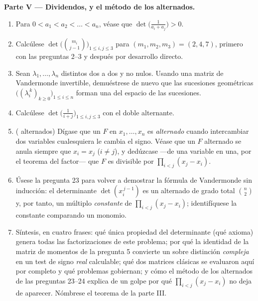 \begin{problem}
\medskip
\noindent\textbf{Parte V --- Dividendos, y el método de los
alternados.}
\begin{enumerate}[resume]
  \item Para $0 < a_1 < a_2 < \dots < a_n$, véase que
        $\det\bigl(\frac{1}{a_i + a_j}\bigr) > 0$.
  \item Calcúlese $\det\bigl(\binom{m_i}{j-1}\bigr)_{1 \leq i, j
        \leq 3}$ para $(m_1, m_2, m_3) = (2, 4, 7)$, primero con las
        preguntas 2--3 y después por desarrollo directo.
  \item Sean $\lambda_1, \dots, \lambda_n$ distintos dos a dos y no
        nulos. Usando una matriz de Vandermonde invertible,
        demuéstrese de nuevo que las sucesiones geométricas
        $\bigl((\lambda_i^{\,k})_{k \geq 0}\bigr)_{1 \leq i \leq n}$
        forman una  del espacio de las sucesiones.
  \item Calcúlese $\det\bigl(\frac{1}{i + j}\bigr)_{1 \leq i, j
        \leq 3}$ con el doble alternante.
  \item ( alternados) Dígase que un  $F$ en
        $x_1, \dots, x_n$ es \emph{alternado} cuando intercambiar
        dos variables cualesquiera le cambia el signo. Véase que un
        $F$ alternado se anula siempre que $x_i = x_j$ ($i \neq j$),
        y dedúzcase ---de una variable en una, por el teorema del
        factor--- que $F$ es divisible por $\prod_{i<j}(x_j - x_i)$.
  \item Úsese la pregunta 23 para volver a demostrar la fórmula de
        Vandermonde sin inducción: el determinante
        $\det(x_i^{\,j-1})$ es un  alternado de grado total
        $\binom n2$ y, por tanto, un múltiplo \emph{constante} de
        $\prod_{i<j}(x_j - x_i)$; identifíquese la constante
        comparando un monomio.
  \item Síntesis, en cuatro frases: qué única propiedad del
        determinante (qué axioma) genera todas las factorizaciones
        de este problema; por qué la identidad de la matriz de
        momentos de la pregunta 5 convierte un  sobre
        distinción \emph{compleja} en un test de signo \emph{real}
        calculable; qué dos matrices clásicas se evaluaron aquí por
        completo y qué problemas  gobiernan; y cómo el
        método de los alternados de las preguntas 23--24 explica de
        un golpe por qué $\prod_{i<j}(x_j - x_i)$ no deja de
        aparecer. Nómbrese el teorema de la parte III.
\end{enumerate}
\end{problem}
